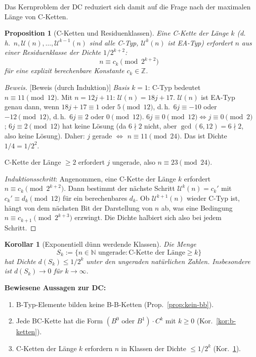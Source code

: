 \documentclass[12pt,a4paper]{article}
\newtheorem{proposition}[definition]{Proposition}
\newtheorem{korollar}[definition]{Korollar}
\newenvironment{beweis}{\begin{proof}[Beweis]}{\end{proof}}
\newcommand{\U}{\mathcal{U}}
\newcommand{\N}{\mathbb{N}}
\newcommand{\Z}{\mathbb{Z}}
\begin{document}
Das Kernproblem der DC reduziert sich damit auf die Frage nach der
maximalen Länge von C-Ketten.

\begin{proposition}[C-Ketten und Residuenklassen]
\label{prop:c-ketten}
Eine C-Kette der Länge $k$ (d.\,h.\ $n, \U(n), \ldots, \U^{k-1}(n)$
sind alle C-Typ, $\U^k(n)$ ist EA-Typ)
erfordert $n$ aus einer Residuenklasse der Dichte $1/2^{k+2}$:
\[
  n \equiv c_k \pmod{2^{k+2}}
\]
für eine explizit berechenbare Konstante $c_k \in \Z$.
\end{proposition}

\begin{beweis}[Beweis (durch Induktion)]
\textit{Basis $k=1$}: C-Typ bedeutet $n \equiv 11 \pmod{12}$.
Mit $n = 12j+11$: $\U(n) = 18j+17$.
$\U(n)$ ist EA-Typ genau dann, wenn $18j+17 \equiv 1$ oder $5 \pmod{12}$,
d.\,h.\ $6j \equiv -10$ oder $-12 \pmod{12}$, d.\,h.\
$6j \equiv 2$ oder $0 \pmod{12}$.
$6j \equiv 0 \pmod{12} \Leftrightarrow j \equiv 0 \pmod{2}$;
$6j \equiv 2 \pmod{12}$ hat keine Lösung (da $6\nmid 2$ nicht,
aber $\gcd(6,12)=6\nmid 2$, also keine Lösung).
Daher: $j$ gerade $\Leftrightarrow$ $n \equiv 11 \pmod{24}$.
Das ist Dichte $1/4 = 1/2^2$. \checkmark

C-Kette der Länge $\geq 2$ erfordert $j$ ungerade, also $n \equiv 23 \pmod{24}$.

\textit{Induktionsschritt}: Angenommen, eine C-Kette der Länge $k$
erfordert $n \equiv c_k \pmod{2^{k+2}}$.
Dann bestimmt der nächste Schritt $\U^k(n) = c_k'$ mit
$c_k' \equiv d_k \pmod{12}$ für ein berechenbares $d_k$.
Ob $\U^{k+1}(n)$ wieder C-Typ ist, hängt von dem nächsten Bit
der Darstellung von $n$ ab, was eine Bedingung $n \equiv c_{k+1} \pmod{2^{k+3}}$
erzwingt. Die Dichte halbiert sich also bei jedem Schritt.
\end{beweis}

\begin{korollar}[Exponentiell dünn werdende Klassen]
\label{kor:dichte}
Die Menge
\[
  S_k := \{n \in \N \text{ ungerade} : \text{C-Kette der Länge} \geq k\}
\]
hat Dichte $d(S_k) \leq 1/2^{k}$ unter den ungeraden natürlichen Zahlen.
Insbesondere ist $d(S_k) \to 0$ für $k \to \infty$.
\end{korollar}

\begin{tcolorbox}[ergebnis]
\textbf{Bewiesene Aussagen zur DC:}
\begin{enumerate}[label=(\arabic*)]
  \item B-Typ-Elemente bilden keine B-B-Ketten (Prop.~\ref{prop:kein-bb}).
  \item Jede BC-Kette hat die Form $(B^0\text{ oder }B^1) \cdot C^k$
    mit $k \geq 0$ (Kor.~\ref{kor:b-ketten}).
  \item C-Ketten der Länge $k$ erfordern $n$ in Klassen der Dichte
    $\leq 1/2^k$ (Kor.~\ref{kor:dichte}).
\end{enumerate}
\end{tcolorbox}
\end{document}
